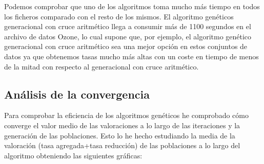 \documentclass[12pt,a4paper]{article}
\begin{document}
	Podemos comprobar que uno de los algoritmos toma mucho más tiempo en todos los ficheros comparado con el resto de los mismos. El algoritmo genéticos generacional con cruce aritmético llega a consumir más de 1100 segundos en el archivo de datos Ozone, lo cual supone que, por ejemplo, el algoritmo genético generacional con cruce aritmético sea una mejor opción en estos conjuntos de datos ya que obtenemos tasas mucho más altas con un coste en tiempo de menos de la mitad con respecto al generacional con cruce aritmético.
	
	\newpage
	
	\subsection{Análisis de la convergencia}
	
	Para comprobar la eficiencia de los algoritmos genéticos he comprobado cómo converge el valor medio de las valoraciones a lo largo de las iteraciones y la generación de las poblaciones. Esto lo he hecho estudiando la media de la valoración (tasa agregada+tasa reducción) de las poblaciones a lo largo del algoritmo obteniendo las siguientes gráficas:
	
\end{document}
